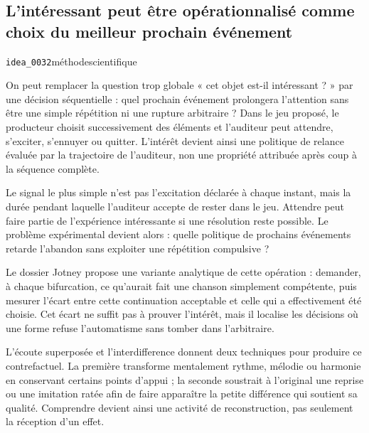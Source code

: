 \documentclass[10pt,a4paper]{article}
\begin{document}
\subsection{L'intéressant peut être opérationnalisé comme choix du meilleur prochain événement}
{\small\color{metadata} \texttt{idea\_0032}\quad\textbullet\quad méthode\quad\textbullet\quad scientifique\par}

On peut remplacer la question trop globale « cet objet est-il intéressant ? » par une décision séquentielle : quel prochain événement prolongera l'attention sans être une simple répétition ni une rupture arbitraire ? Dans le jeu proposé, le producteur choisit successivement des éléments et l'auditeur peut attendre, s'exciter, s'ennuyer ou quitter. L'intérêt devient ainsi une politique de relance évaluée par la trajectoire de l'auditeur, non une propriété attribuée après coup à la séquence complète.

Le signal le plus simple n'est pas l'excitation déclarée à chaque instant, mais la durée pendant laquelle l'auditeur accepte de rester dans le jeu. Attendre peut faire partie de l'expérience intéressante si une résolution reste possible. Le problème expérimental devient alors : quelle politique de prochains événements retarde l'abandon sans exploiter une répétition compulsive ?

Le dossier Jotney propose une variante analytique de cette opération : demander, à chaque bifurcation, ce qu'aurait fait une chanson simplement compétente, puis mesurer l'écart entre cette continuation acceptable et celle qui a effectivement été choisie. Cet écart ne suffit pas à prouver l'intérêt, mais il localise les décisions où une forme refuse l'automatisme sans tomber dans l'arbitraire.

L'écoute superposée et l'interdifference donnent deux techniques pour produire ce contrefactuel. La première transforme mentalement rythme, mélodie ou harmonie en conservant certains points d'appui ; la seconde soustrait à l'original une reprise ou une imitation ratée afin de faire apparaître la petite différence qui soutient sa qualité. Comprendre devient ainsi une activité de reconstruction, pas seulement la réception d'un effet.
\end{document}
